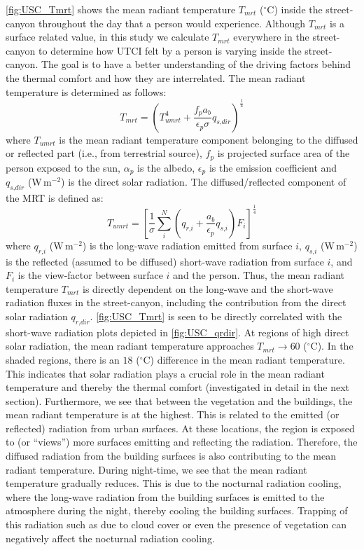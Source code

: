 \cref{fig:USC_Tmrt} shows the mean radiant temperature $T_{\textit{mrt}}$  ($^{\circ}$C) inside the street-canyon throughout the day that a person would experience. Although $T_{\textit{mrt}}$ is a surface related value, in this study we calculate $T_{\textit{mrt}}$ everywhere in the street-canyon to determine how UTCI felt by a person is varying inside the street-canyon. The goal is to have a better understanding of the driving factors behind the thermal comfort and how they are interrelated. The mean radiant temperature is determined as follows: 
\begin{equation}
T_{\textit{mrt}} = \left( T_{\textit{umrt}}^4  + \frac{f_p a_b}{\epsilon_p \sigma} q_{\textit{s,dir}} \right)^{\frac{1}{4}}
\label{eq:Tmrt2}
\end{equation}
where $T_{\textit{umrt}}$ is the mean radiant temperature component belonging to the diffused or reflected part (i.e., from terrestrial source), $f_p$ is projected surface area of the person exposed to the sun, $\alpha_p$ is the albedo, $\epsilon_p$ is the emission coefficient and $q_{\textit{s,dir}}$ (W\,m$^{-2}$) is the direct solar radiation. The diffused/reflected component of the MRT is defined as:
\begin{equation}
T_{\textit{umrt}} = \left[ \frac{1}{\sigma} \sum_{i}^N \left(q_{\textit{r,i}} + \frac{a_b}{\epsilon_p} q_{\textit{s,i}} \right)F_i\right]^{\frac{1}{4}}
\label{eq:Tumrt2}
\end{equation}
where $q_{\textit{r,i}}$ (W\,m$^{-2}$)  is the long-wave radiation emitted from surface $i$, $q_{\textit{s,i}}$ (W\,m$^{-2}$) is the reflected (assumed to be diffused) short-wave radiation from surface $i$, and $F_i$ is the view-factor between surface $i$ and the person. Thus, the mean radiant temperature $T_{\textit{mrt}}$ is directly dependent on the long-wave and the short-wave radiation fluxes in the street-canyon, including the contribution from the direct solar radiation $q_{\textit{r,dir}}$. \cref{fig:USC_Tmrt} is seen to be directly correlated with the short-wave radiation plots depicted in \cref{fig:USC_qrdir}. At regions of high direct solar radiation, the mean radiant temperature approaches $T_{\textit{mrt}}\rightarrow60$ ($^{\circ}$C). In the shaded regions, there is an $18$  ($^{\circ}$C) difference in the mean radiant temperature. This indicates that solar radiation plays a crucial role in the mean radiant temperature and thereby the thermal comfort (investigated in detail in the next section). Furthermore, we see that between the vegetation and the buildings, the mean radiant temperature is at the highest. This is related to the emitted (or reflected) radiation from urban surfaces. At these locations, the region is exposed to (or ``views'') more surfaces emitting and reflecting the radiation. Therefore, the diffused radiation from the building surfaces is also contributing to the mean radiant temperature. During night-time, we see that the mean radiant temperature gradually reduces. This is due to the nocturnal radiation cooling, where the long-wave radiation from the building surfaces is emitted to the atmosphere during the night, thereby cooling the building surfaces. Trapping of this radiation such as due to cloud cover or even the presence of vegetation can negatively affect the nocturnal radiation cooling.


